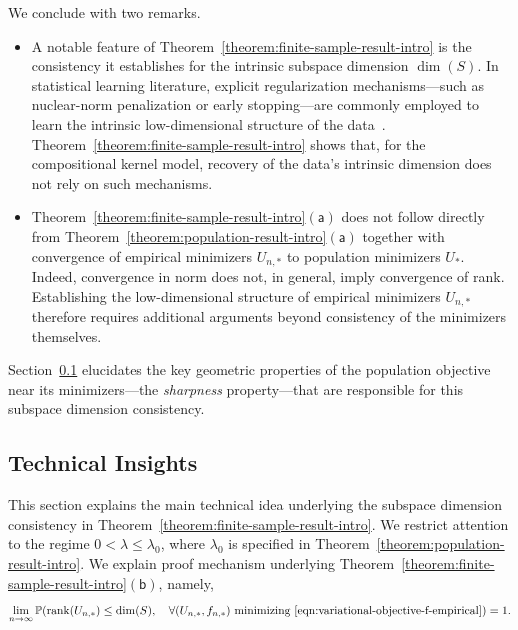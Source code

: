 \documentclass[sn-mathphys-num]{sn-jnl}%
\numberwithin{equation}{section}
\renewcommand{\P}{\mathbb{P}}
\newcommand{\rank}{{\rm rank}}
\theoremstyle{thmstyleone}%
\theoremstyle{thmstyletwo}%
\theoremstyle{thmstylethree}%
\begin{document}
We conclude with two remarks.  \vspace{.5em}
\begin{itemize}
\item A notable feature of Theorem~\ref{theorem:finite-sample-result-intro} is the
consistency it establishes for the intrinsic subspace dimension $\dim(S)$.
In statistical learning literature, explicit regularization mechanisms—such
as nuclear-norm penalization or early stopping—are commonly employed to learn the 
intrinsic low-dimensional structure of the data~\cite{HastieTiFr09}. Theorem~\ref{theorem:finite-sample-result-intro}
shows that, for the compositional kernel model, recovery of the data's intrinsic
dimension does not rely on such mechanisms.

 
 \vspace{.5em} 
\item Theorem~\ref{theorem:finite-sample-result-intro}$\mathsf{(a)}$ does not follow directly from
Theorem~\ref{theorem:population-result-intro}$\mathsf{(a)}$ together with convergence of
empirical minimizers $U_{n, *}$ to population minimizers $U_*$. Indeed, convergence in norm does not, in
general, imply convergence of rank. Establishing the low-dimensional structure of
empirical minimizers $U_{n, *}$ therefore requires additional arguments beyond consistency of the
minimizers themselves.
\end{itemize} 
\vspace{.5em} 

 
Section~\ref{sec:technical-insight} elucidates the key geometric properties of the population
objective near its minimizers---the \emph{sharpness} property---that are 
responsible for this subspace dimension consistency.

\newcommand{\col}{{\rm col}}
\subsection{Technical Insights} 
\label{sec:technical-insight}
\indent\indent 
This section explains the main technical idea underlying the subspace dimension consistency in 
Theorem~\ref{theorem:finite-sample-result-intro}. We restrict attention to the regime $0 < \lambda \le \lambda_0$, where $\lambda_0$ is specified in Theorem~\ref{theorem:population-result-intro}. We explain proof mechanism underlying Theorem~\ref{theorem:finite-sample-result-intro}$\mathsf{(b)}$, namely,
\begin{equation*}
	\lim_{n \to \infty} \P( \rank(U_{n, *}) \le \dim(S),~~~\forall (U_{n, *}, f_{n, *})~\text{minimizing~\eqref{eqn:variational-objective-f-empirical}}) = 1.
\end{equation*}
\end{document}
